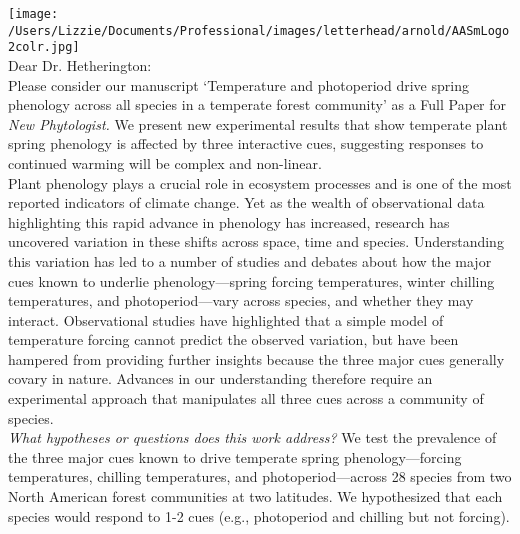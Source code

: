\documentclass[11pt,a4paper]{article}
\begin{document}
\noindent \texttt{[image: /Users/Lizzie/Documents/Professional/images/letterhead/arnold/AASmLogo2colr.jpg]}
\vspace{1ex}\\

\noindent Dear Dr. Hetherington: %
\vspace{1.5ex}\\
\noindent Please consider our manuscript `Temperature and photoperiod drive spring phenology across all species in a temperate forest community' as a Full Paper for \emph{New Phytologist.} We present new experimental results that show temperate plant spring phenology is affected by three interactive cues, suggesting responses to continued warming will be complex and non-linear. %
\vspace{-0.5ex}\\
Plant phenology plays a crucial role in ecosystem processes and is one of the most reported indicators of climate change. Yet as the wealth of observational data highlighting this rapid advance in phenology has increased, research has uncovered variation in these shifts across space, time and species. Understanding this variation has led to a number of studies and debates about how the major cues known to underlie phenology---spring forcing temperatures, winter chilling temperatures, and photoperiod---vary across species, and whether they may interact. Observational studies have highlighted that a simple model of temperature forcing cannot predict the observed variation, but have been hampered from providing further insights because the three major cues generally covary in nature. Advances in our understanding therefore require an experimental approach that manipulates all three cues across a community of species. 
\vspace{1.5ex}\\
\emph{What hypotheses or questions does this work address?} We test the prevalence of the three major cues known to drive temperate spring phenology---forcing temperatures, chilling temperatures, and photoperiod---across 28 species from two North American forest communities at two latitudes. We hypothesized that each species would respond to 1-2 cues (e.g., photoperiod and chilling but not forcing).
\vspace{1.5ex}\\
\end{document}
